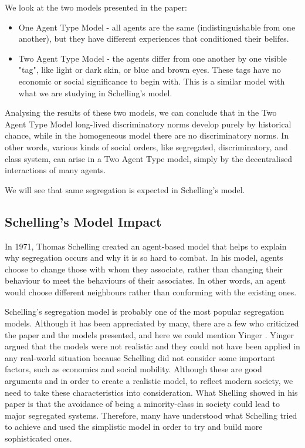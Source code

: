 \documentclass[../main.tex]{subfiles}
\begin{document}
We look at the two models presented in the paper:
\begin{itemize}
    \item One Agent Type Model - all agents are the same (indistinguishable from one another), but they have different experiences that conditioned their belifes.
    \item Two Agent Type Model - the agents differ from one another by one visible "tag", like light or dark skin, or blue and brown eyes. These tags have no economic or social significance to begin with. This is a similar model with what we are studying in Schelling's model.
\end{itemize}
Analysing the results of these two models, we can conclude that in the Two Agent Type Model long-lived discriminatory norms develop purely by historical chance, while in the homogeneous model there are no discriminatory norms. In other words, various kinds of social orders, like segregated, discriminatory, and class system, can arise in a Two Agent Type model, simply by the decentralised interactions of many agents.

We will see that same segregation is expected in Schelling's model.


\subsection{Schelling's Model Impact}

In 1971, Thomas Schelling created an agent-based model that helps to explain why segregation occurs and why it is so hard to combat. In his model, agents choose to change those with whom they associate, rather than changing their behaviour to meet the behaviours of their associates. In other words, an agent would choose different neighbours rather than conforming with the existing ones. 

Schelling's segregation model is probably one of the most popular segregation models. Although it has been appreciated by many, there are a few who criticized the paper and the models presented, and here we could mention Yinger \cite[]{yinger}. Yinger argued
that the models were not realistic and they could not have been applied in any real-world situation because Schelling did not consider some important factors, such as economics and social mobility. Although these are good arguments and in order to create a realistic model, to reflect modern society, we need to take these characteristics into consideration. What Shelling showed in his paper is that the avoidance of being a minority-class in society could lead to major segregated systems. Therefore, many have understood what Schelling tried to achieve and used the simplistic model in order to try and build more sophisticated ones. 
\end{document}
